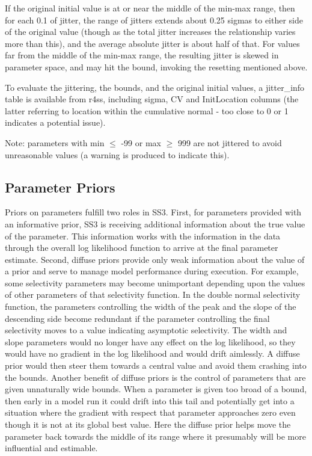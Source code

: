 If the original initial value is at or near the middle of the min-max range, then for each 0.1 of jitter, the range of jitters extends about 0.25 sigmas to either side of the original value (though as the total jitter increases the relationship varies more than this), and the average absolute jitter is about half of that.  For values far from the middle of the min-max range, the resulting jitter is skewed in parameter space, and may hit the bound, invoking the resetting mentioned above. 

To evaluate the jittering, the bounds, and the original initial values, a jitter\_info table is available from r4ss, including sigma, CV and InitLocation columns (the latter referring to location within the cumulative normal - too close to 0 or 1 indicates a potential issue).

Note: parameters with min $\leq$ -99 or max $\geq$ 999 are not jittered to avoid unreasonable values (a warning is produced to indicate this).

\hypertarget{PriorDescrip}{}
\subsection{Parameter Priors}
Priors on parameters fulfill two roles in SS3.  First, for parameters provided with an informative prior, SS3 is receiving additional information about the true value of the parameter.  This information works with the information in the data through the overall log likelihood function to arrive at the final parameter estimate.  Second, diffuse priors provide only weak information about the value of a prior and serve to manage model performance during execution.  For example, some selectivity parameters may become unimportant depending upon the values of other parameters of that selectivity function.  In the double normal selectivity function, the parameters controlling the width of the peak and the slope of the descending side become redundant if the parameter controlling the final selectivity moves to a value indicating asymptotic selectivity.  The width and slope parameters would no longer have any effect on the log likelihood, so they would have no gradient in the log likelihood and would drift aimlessly.  A diffuse prior would then steer them towards a central value and avoid them crashing into the bounds.  Another benefit of diffuse priors is the control of parameters that are given unnaturally wide bounds.  When a parameter is given too broad of a bound, then early in a model run it could drift into this tail and potentially get into a situation where the gradient with respect that parameter approaches zero even though it is not at its global best value.  Here the diffuse prior helps move the parameter back towards the middle of its range where it presumably will be more influential and estimable.  

